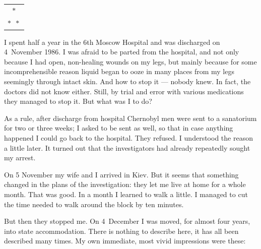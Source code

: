 \documentclass[openright]{bookest}
\newcommand{\varthreestars}{\begin{center}\begin{tabular}{c}$\ast$\\[-0.8ex] $\ast\enspace \ast $\end{tabular}\end{center}}
\begin{document}
\varthreestars

I spent half a year in the 6th Moscow Hospital and was discharged on 4~November 1986. I was afraid to be parted from the hospital, and not only because I had open, non-healing wounds on my legs, but mainly because for some incomprehensible reason liquid began to ooze in many places from my legs seemingly through intact skin. And how to stop it --- nobody knew. In fact, the doctors did not know either. Still, by trial and error with various medications they managed to stop it. But what was I to do?

As a rule, after discharge from hospital Chernobyl men were sent to a sanatorium for two or three weeks; I asked to be sent as well, so that in case anything happened I could go back to the hospital. They refused. I understood the reason a little later. It turned out that the investigators had already repeatedly sought my arrest.

On 5 November my wife and I arrived in Kiev. But it seems that something changed in the plans of the investigation: they let me live at home for a whole month. That was good. In a month I learned to walk a little. I managed to cut the time needed to walk around the block by ten minutes.

But then they stopped me. On 4~December I was moved, for almost four years, into state accommodation. There is nothing to describe here, it has all been described many times. My own immediate, most vivid impressions were these:
\end{document}
